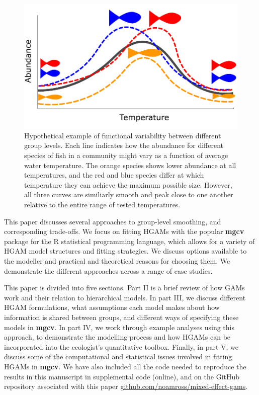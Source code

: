 \documentclass[12pt]{article}
\begin{document}
\begin{figure}

{\centering \includegraphics[width=.6\linewidth]{../figures/temp_growth_example} 

}

\caption{\label{fig:fish_size}Hypothetical example of functional variability between different group levels. Each line indicates how the abundance for different species of fish in a community might vary as a function of average water temperature. The orange species shows lower abundance at all temperatures, and the red and blue species differ at which temperature they can achieve the maximum possible size. However, all three curves are similiarly smooth and peak close to one another relative to the entire range of tested temperatures.}\label{fig:fish_size}
\end{figure}

This paper discusses several approaches to group-level smoothing, and
corresponding trade-offs. We focus on fitting HGAMs with the popular
\textbf{mgcv} package for the R statistical programming language, which
allows for a variety of HGAM model structures and fitting strategies. We
discuss options available to the modeller and practical and theoretical
reasons for choosing them. We demonstrate the different approaches
across a range of case studies.

This paper is divided into five sections. Part II is a brief review of
how GAMs work and their relation to hierarchical models. In part III, we
discuss different HGAM formulations, what assumptions each model makes
about how information is shared between groups, and different ways of
specifying these models in \textbf{mgcv}. In part IV, we work through
example analyses using this approach, to demonstrate the modelling
process and how HGAMs can be incorporated into the ecologist's
quantitative toolbox. Finally, in part V, we discuss some of the
computational and statistical issues involved in fitting HGAMs in
\textbf{mgcv}. We have also included all the code needed to reproduce
the results in this manuscript in supplemental code (online), and on the
GitHub repository associated with this paper
\href{http://www.github.com/noamross/mixed-effect-gams}{github.com/noamross/mixed-effect-gams}.
\end{document}
